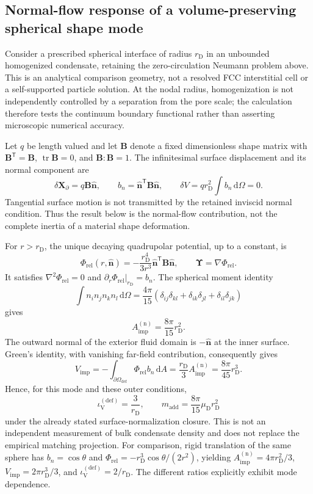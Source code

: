 \subsection*{Normal-flow response of a volume-preserving spherical shape mode}
\label{sec:AP_quadrupolar_benchmark}

Consider a prescribed spherical interface of radius $r_{\mathrm D}$ in an unbounded homogenized condensate, retaining the zero-circulation Neumann problem above. This is an analytical comparison geometry, not a resolved FCC interstitial cell or a self-supported particle solution. At the nodal radius, homogenization is not independently controlled by a separation from the pore scale; the calculation therefore tests the continuum boundary functional rather than asserting microscopic numerical accuracy.

Let $q$ be length valued and let $\mathbf B$ denote a fixed dimensionless shape matrix with $\mathbf B^{\mathsf T}=\mathbf B$, $\operatorname{tr}\mathbf B=0$, and $\mathbf B:\mathbf B=1$. The infinitesimal surface displacement and its normal component are
\[
 \delta\mathbf X_\partial=q\mathbf B\hat{\mathbf n},\qquad
 b_n=\hat{\mathbf n}^{\mathsf T}\mathbf B\hat{\mathbf n},\qquad
 \delta V=q r_{\mathrm D}^{2}\int b_n\,\mathrm d\Omega=0.
\]
Tangential surface motion is not transmitted by the retained inviscid normal condition. Thus the result below is the normal-flow contribution, not the complete inertia of a material shape deformation.

For $r>r_{\mathrm D}$, the unique decaying quadrupolar potential, up to a constant, is
\[
 \Phi_{\mathrm{rel}}(r,\hat{\mathbf n})
 =-\frac{r_{\mathrm D}^{4}}{3r^{3}}
 \hat{\mathbf n}^{\mathsf T}\mathbf B\hat{\mathbf n},
 \qquad \boldsymbol\Upsilon=\nabla\Phi_{\mathrm{rel}}.
\]
It satisfies $\nabla^2\Phi_{\mathrm{rel}}=0$ and
$\partial_r\Phi_{\mathrm{rel}}|_{r_{\mathrm D}}=b_n$.
The spherical moment identity
\[
 \int n_i n_j n_k n_l\,\mathrm d\Omega
 =\frac{4\pi}{15}
 (\delta_{ij}\delta_{kl}+\delta_{ik}\delta_{jl}+\delta_{il}\delta_{jk})
\]
gives
\[
 A_{\mathrm{imp}}^{(\mathrm n)}=\frac{8\pi}{15}r_{\mathrm D}^{2}.
\]
The outward normal of the exterior fluid domain is $-\hat{\mathbf n}$ at the inner surface. Green's identity, with vanishing far-field contribution, consequently gives
\[
 V_{\mathrm{imp}}
 =-\int_{\partial\Omega_{\mathrm{def}}}\Phi_{\mathrm{rel}}b_n\,\mathrm dA
 =\frac{r_{\mathrm D}}3 A_{\mathrm{imp}}^{(\mathrm n)}
 =\frac{8\pi}{45}r_{\mathrm D}^{3}.
\]
Hence, for this mode and these outer conditions,
\[
 \iota_{\mathrm V}^{(\mathrm{def})}=\frac3{r_{\mathrm D}},\qquad
 m_{\mathrm{add}}=\frac{8\pi}{15}\mu_{\mathrm D}r_{\mathrm D}^{2}
\]
under the already stated surface-normalization closure. This is not an independent measurement of bulk condensate density and does not replace the empirical matching projection. For comparison, rigid translation of the same sphere has $b_n=\cos\theta$ and
$\Phi_{\mathrm{rel}}=-r_{\mathrm D}^{3}\cos\theta/(2r^2)$, yielding
$A_{\mathrm{imp}}^{(\mathrm n)}=4\pi r_{\mathrm D}^{2}/3$,
$V_{\mathrm{imp}}=2\pi r_{\mathrm D}^{3}/3$, and
$\iota_{\mathrm V}^{(\mathrm{def})}=2/r_{\mathrm D}$.
The different ratios explicitly exhibit mode dependence.

